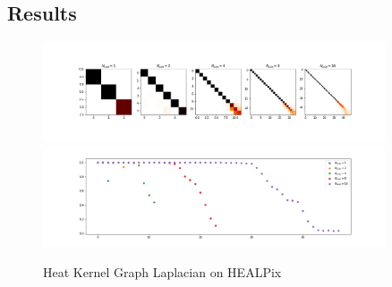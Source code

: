 \subsection{Results}
\begin{figure}[h]
	\label{fig:HeatKernelGraphLaplacianHealpix}
	\caption{Heat Kernel Graph Laplacian on HEALPix}
	\centering
	\includegraphics[width=0.9\textwidth]{../codes/02.HeatKernelGraphLaplacian/HEALPix/06_figures/optimal_thresholded.png}
	\includegraphics[width=0.9\textwidth]{../codes/02.HeatKernelGraphLaplacian/HEALPix/06_figures/optimal_thresholded_diagonal.png}	
\end{figure}

